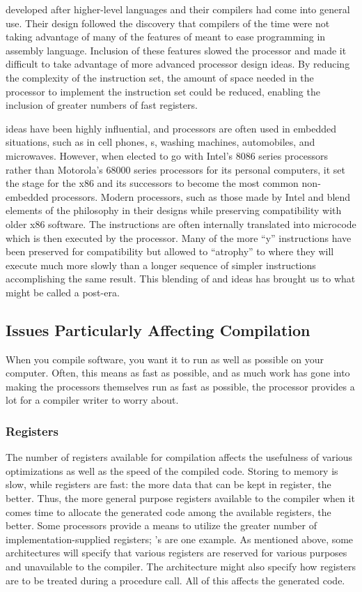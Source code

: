 \RISCs developed after higher-level languages and their compilers had come into general use. Their design followed the discovery that compilers of the time were not taking advantage of many of the features of \CISCs meant to ease programming in assembly language. Inclusion of these features slowed the processor and made it difficult to take advantage of more advanced processor design ideas. By reducing the complexity of the instruction set, the amount of space needed in the processor to implement the instruction set could be reduced, enabling the inclusion of greater numbers of fast registers.

\RISC ideas have been highly influential, and \RISC processors are often used in embedded situations, such as in cell phones, s, washing machines, automobiles, and microwaves. However, when  elected to go with Intel's 8086 series \CISC processors rather than Motorola's 68000 series \RISC processors for its personal computers, it set the stage for the x86 and its successors to become the most common non-embedded processors. Modern \CISC processors, such as those made by Intel and  blend elements of the \RISC philosophy in their designs while preserving compatibility with older x86 software. The \CISC instructions are often internally translated into \RISC microcode which is then executed by the processor. Many of the more ``\CISC{}y'' instructions have been preserved for compatibility but allowed to ``atrophy'' to where they will execute much more slowly than a longer sequence of simpler instructions accomplishing the same result. This blending of \RISC and \CISC ideas has brought us to what might be called a post-\RISC era.

\subsection{Issues Particularly Affecting Compilation}
When you compile software, you want it to run as well as possible on your computer. Often, this means as fast as possible, and as much work has gone into making the processors themselves run as fast as possible, the processor provides a lot for a compiler writer to worry about.

\subsubsection{Registers}
The number of registers available for compilation affects the usefulness of various optimizations as well as the speed of the compiled code. Storing to memory is slow, while registers are fast: the more data that can be kept in register, the better. Thus, the more general purpose registers available to the compiler when it comes time to allocate the generated code among the available registers, the better. Some processors provide a means to utilize the greater number of implementation-supplied registers; 's  are one example. As mentioned above, some architectures will specify that various registers are reserved for various purposes and unavailable to the compiler. The architecture might also specify how registers are to be treated during a procedure call. All of this affects the generated code.

